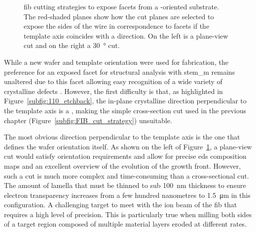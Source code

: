 \begin{figure}
    \caption[\acs{fib} cutting strategies to expose  facets from a \hkl(1 1 0) substrate.]{\acs{fib} cutting strategies to expose  facets from a \hkl[1 1 0]-oriented substrate. The red-shaded planes show how the cut planes are selected to expose the sides of the wire in correspondence to  facets if the template axis coincides with a  direction. On the left is a plane-view cut and on the right a \qty{30}{\degree} cut.}
    \label{fig:110_FIB}
\end{figure}

While a new  wafer and  template orientation were used for fabrication, the preference for an exposed  facet for structural analysis with \acs{stem_m} remains unaltered due to this facet allowing easy recognition of a wide variety of crystalline defects \cite{Dasilva2017}. However, the first difficulty is that, as highlighted in Figure~\ref{subfig:110_etchback}, the in-plane crystalline direction perpendicular to the  template axis is a , making the simple cross-section cut used in the previous chapter (Figure~\ref{subfig:FIB_cut_strategy}) unsuitable.

The most obvious  direction perpendicular to the  template axis is the one that defines the wafer orientation itself. As shown on the left of Figure~\ref{fig:110_FIB}, a plane-view cut would satisfy orientation requirements and allow for precise \acf{eds} composition maps and an excellent overview of the evolution of the growth front. However, such a cut is much more complex and time-consuming than a cross-sectional cut. The amount of lamella that must be thinned to sub \qty{100}{\nano\metre} thickness to ensure electron transparency increases from a few hundred nanometres to \qty{1.5}{\micro\metre} in this configuration. A challenging target to meet with the ion beam of the \acs{fib} that requires a high level of precision. This is particularly true when milling both sides of a target region composed of multiple material layers eroded at different rates.

